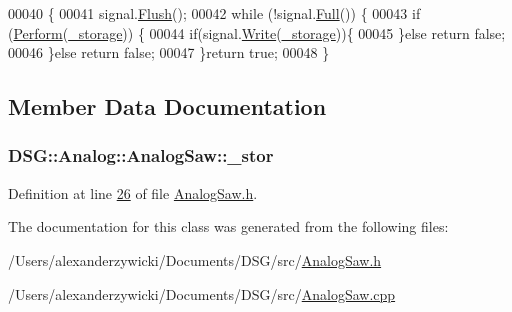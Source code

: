 \begin{DoxyCode}
00040                                                                     \{
00041             signal.\hyperlink{class_d_s_g_1_1_ring_buffer_ab23c8003d2857809a816068eeb209d60}{Flush}();
00042             \textcolor{keywordflow}{while} (!signal.\hyperlink{class_d_s_g_1_1_ring_buffer_a53ddb04ffcbb5470a8d2b0a3c65b70cb}{Full}()) \{
00043                 \textcolor{keywordflow}{if} (\hyperlink{class_d_s_g_1_1_analog_1_1_analog_saw_a8d36e77c09ba84128e786c7bb14cddda}{Perform}(\hyperlink{class_d_s_g_1_1_signal_generator_a28a9b47a1aa0783029f11a19ba0363f2}{\_storage})) \{
00044                     \textcolor{keywordflow}{if}(signal.\hyperlink{class_d_s_g_1_1_ring_buffer_aa5dd2caa0a270173251faee40a43d692}{Write}(\hyperlink{class_d_s_g_1_1_signal_generator_a28a9b47a1aa0783029f11a19ba0363f2}{\_storage}))\{
00045                     \}\textcolor{keywordflow}{else} \textcolor{keywordflow}{return} \textcolor{keyword}{false};
00046                 \}\textcolor{keywordflow}{else} \textcolor{keywordflow}{return} \textcolor{keyword}{false};
00047             \}\textcolor{keywordflow}{return} \textcolor{keyword}{true};
00048         \}
\end{DoxyCode}


\subsection{Member Data Documentation}
\hypertarget{class_d_s_g_1_1_analog_1_1_analog_saw_a81a923800bb8ba0f788d3567d2965d2a}{
\subsubsection[{\+\_\+stor}]{ D\+S\+G\+::\+Analog\+::\+Analog\+Saw\+::\+\_\+stor\hspace{0.3cm}{\ttfamily [protected]}}}\label{class_d_s_g_1_1_analog_1_1_analog_saw_a81a923800bb8ba0f788d3567d2965d2a}


Definition at line \hyperlink{_analog_saw_8h_source_l00026}{26} of file \hyperlink{_analog_saw_8h_source}{Analog\+Saw.\+h}.



The documentation for this class was generated from the following files\+:\begin{DoxyCompactItemize}
\item 
/\+Users/alexanderzywicki/\+Documents/\+D\+S\+G/src/\hyperlink{_analog_saw_8h}{Analog\+Saw.\+h}\item 
/\+Users/alexanderzywicki/\+Documents/\+D\+S\+G/src/\hyperlink{_analog_saw_8cpp}{Analog\+Saw.\+cpp}\end{DoxyCompactItemize}
